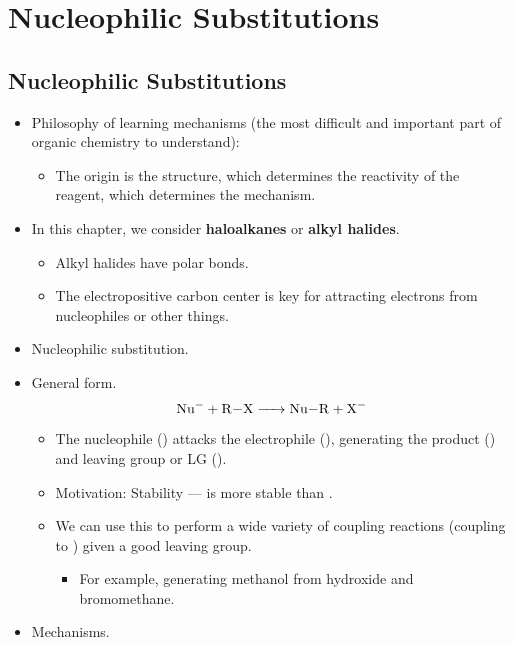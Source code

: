 \documentclass[../notes.tex]{subfiles}
\begin{document}
\chapter{Nucleophilic Substitutions}
\section{Nucleophilic Substitutions}
\begin{itemize}
    \item {}Philosophy of learning mechanisms (the most difficult and important part of organic chemistry to understand):
    \begin{itemize}
        \item The origin is the structure, which determines the reactivity of the reagent, which determines the mechanism.
    \end{itemize}
    \item In this chapter, we consider \textbf{haloalkanes} or \textbf{alkyl halides}.
    \begin{itemize}
        \item Alkyl halides have polar bonds.
        \item The electropositive carbon center is key for attracting electrons from nucleophiles or other things.
    \end{itemize}
    \item Nucleophilic substitution.
    \item General form.
    \begin{equation*}
        \ce{Nu- + R-X -> Nu-R + X-}
    \end{equation*}
    \begin{itemize}
        \item The nucleophile () attacks the electrophile (), generating the product () and leaving group or LG ().
        \item Motivation: Stability ---  is more stable than .
        \item We can use this to perform a wide variety of coupling reactions (coupling  to ) given a good leaving group.
        \begin{itemize}
            \item For example, generating methanol from hydroxide and bromomethane.
        \end{itemize}
    \end{itemize}
    \item Mechanisms.

\end{itemize}
\end{document}
